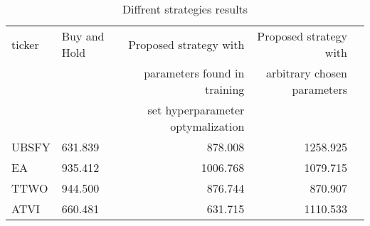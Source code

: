 \begin{table}
\centering
\caption{Diffrent strategies results}
\begin{tabular}{llrrr}
\toprule
 ticker &  Buy and Hold &  Proposed strategy with  &  Proposed strategy with  \\
  &        &                                            parameters found in training &                                           arbitrary chosen parameters \\
  &        &                                            set hyperparameter optymalization &                                            \\

 \midrule
  UBSFY &       631.839 &                                            878.008 &                                           1258.925 \\
    EA &       935.412 &                                           1006.768 &                                           1079.715 \\
   TTWO &       944.500 &                                            876.744 &                                            870.907 \\
   ATVI &       660.481 &                                            631.715 &                                           1110.533 \\
\bottomrule
\end{tabular}
\end{table}
